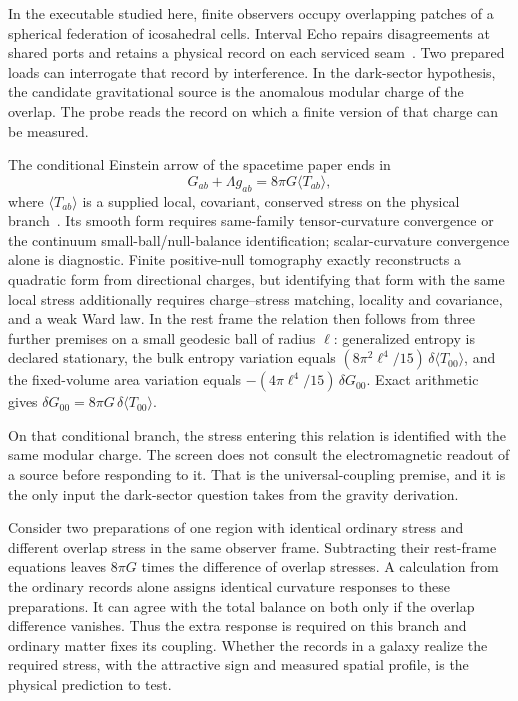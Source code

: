 \documentclass[11pt]{article}
\begin{document}
In the executable studied here, finite observers occupy overlapping
patches of a spherical federation of icosahedral cells. Interval Echo
repairs disagreements at shared ports and retains a physical record on
each serviced seam~\cite{ophmodel}. Two prepared loads can interrogate
that record by interference. In the dark-sector hypothesis, the
candidate gravitational source is the anomalous modular charge of the
overlap. The probe reads the record on which a finite version of that
charge can be measured.

The conditional Einstein arrow of the spacetime paper ends in
\begin{equation}
G_{ab}+\Lambda g_{ab}=8\pi G\langle T_{ab}\rangle,
\label{eq:einstein}
\end{equation}
where \(\langle T_{ab}\rangle\) is a supplied local, covariant, conserved
stress on the physical branch~\cite{ophEinstein}. Its smooth form requires
same-family tensor-curvature convergence or the continuum
small-ball/null-balance identification; scalar-curvature convergence alone is
diagnostic. Finite positive-null
tomography exactly reconstructs a quadratic form from directional charges,
but identifying that form with the same local stress additionally requires
charge--stress matching, locality and covariance, and a weak Ward law. In the
rest frame the relation then follows from three further premises on a small
geodesic ball of radius \(\ell\): generalized entropy is declared stationary,
the bulk entropy variation equals
\((8\pi^2\ell^4/15)\,\delta\langle T_{00}\rangle\), and the fixed-volume area
variation equals \(-(4\pi\ell^4/15)\,\delta G_{00}\). Exact arithmetic gives
\(\delta G_{00}=8\pi G\,\delta\langle T_{00}\rangle\).

On that conditional branch, the stress entering this relation is identified
with the same modular charge. The screen does not
consult the electromagnetic readout of a source before responding to it. That
is the universal-coupling premise, and it is the only input the dark-sector
question takes from the gravity derivation.

Consider two preparations of one region with identical ordinary stress
and different overlap stress in the same observer frame. Subtracting
their rest-frame equations leaves $8\pi G$ times the difference of
overlap stresses. A calculation from the ordinary records alone
assigns identical curvature responses to these preparations. It can
agree with the total balance on both only if the overlap difference
vanishes. Thus the extra response is required on this branch and
ordinary matter fixes its coupling. Whether the records in a galaxy realize
the required stress, with the attractive sign and measured spatial
profile, is the physical prediction to test.
\end{document}
